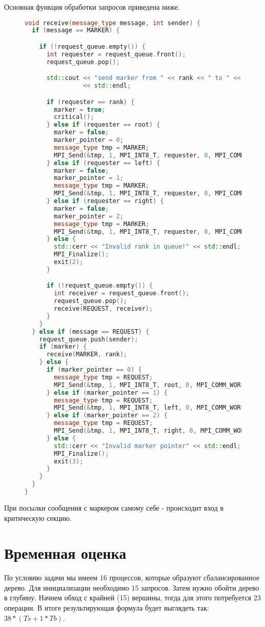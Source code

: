 \documentclass[12pt, oneside, a4paper]{article}
\begin{document}
Основная функция обработки запросов приведена ниже.

\begin{figure}[h]
\begin{lstlisting}[language=C++]
void receive(message_type message, int sender) {
  if (message == MARKER) {

    if (!request_queue.empty()) {
      int requester = request_queue.front();
      request_queue.pop();

      std::cout << "send marker from " << rank << " to " << requester
                << std::endl;

      if (requester == rank) {
        marker = true;
        critical();
      } else if (requester == root) {
        marker = false;
        marker_pointer = 0;
        message_type tmp = MARKER;
        MPI_Send(&tmp, 1, MPI_INT8_T, requester, 0, MPI_COMM_WORLD);
      } else if (requester == left) {
        marker = false;
        marker_pointer = 1;
        message_type tmp = MARKER;
        MPI_Send(&tmp, 1, MPI_INT8_T, requester, 0, MPI_COMM_WORLD);
      } else if (requester == right) {
        marker = false;
        marker_pointer = 2;
        message_type tmp = MARKER;
        MPI_Send(&tmp, 1, MPI_INT8_T, requester, 0, MPI_COMM_WORLD);
      } else {
        std::cerr << "Invalid rank in queue!" << std::endl;
        MPI_Finalize();
        exit(2);
      }

      if (!request_queue.empty()) {
        int receiver = request_queue.front();
        request_queue.pop();
        receive(REQUEST, receiver);
      }
    }
  } else if (message == REQUEST) {
    request_queue.push(sender);
    if (marker) {
      receive(MARKER, rank);
    } else {
      if (marker_pointer == 0) {
        message_type tmp = REQUEST;
        MPI_Send(&tmp, 1, MPI_INT8_T, root, 0, MPI_COMM_WORLD);
      } else if (marker_pointer == 1) {
        message_type tmp = REQUEST;
        MPI_Send(&tmp, 1, MPI_INT8_T, left, 0, MPI_COMM_WORLD);
      } else if (marker_pointer == 2) {
        message_type tmp = REQUEST;
        MPI_Send(&tmp, 1, MPI_INT8_T, right, 0, MPI_COMM_WORLD);
      } else {
        std::cerr << "Invalid marker pointer" << std::endl;
        MPI_Finalize();
        exit(3);
      }
    }
  }
}
\end{lstlisting}
\end{figure}

При посылки сообщения с маркером самому себе - происходит вход в критическую секцию.

\section{Временная оценка}

По условию задачи мы имеем 16 процессов, которые образуют сбалансированное дерево. Для инициализации необходимо 15 запросов. Затем нужно обойти дерево в глубину. Начнем обход с крайней (15) вершины, тогда для этого потребуется 23 операции. В итоге результирующая формула будет выглядеть так: $38*(Ts+1*Tb)$.
\end{document}
